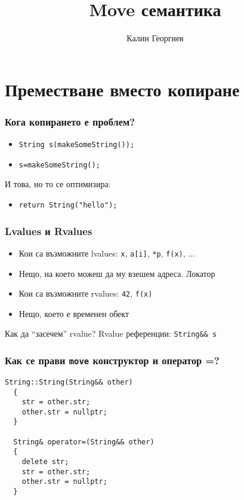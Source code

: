 \documentclass{beamer}
\begin{document}
\title[Обектно-ориентирано програмиране]{Move семантика} 
\author{Калин Георгиев} 
\frame{\titlepage} 


\section{Преместване вместо копиране} 

\begin{frame}[fragile]
  \frametitle{Кога копирането е проблем?}
  \begin{itemize}
    \item \verb#String s(makeSomeString());#
    \item \verb#s=makeSomeString();#
  \end{itemize}

  \bigskip
  И това, но то се оптимизира:
  \bigskip

  \begin{itemize}
    \item \verb#return String("hello");#
  \end{itemize}
\end{frame}


\begin{frame}[fragile]
  \frametitle{Lvalues и Rvalues}

  \begin{itemize}
    \item Кои са възможните lvalues: \texttt{x}, \texttt{a[i]}, \texttt{*p}, \texttt{f(x)}, ...
    \item Нещо, на което можеш да му взешем адреса. Локатор
    \item Кои са възможните rvalues: \texttt{42}, \texttt{f(x)}
    \item Нещо, което е временен обект
  \end{itemize}

  \bigskip

  Как да ``засечем'' rvalue? Rvalue референции: \verb#String&& s#

    
\end{frame}


\begin{frame}[fragile]
  \frametitle{Как се прави \texttt{move} конструктор и оператор =?}

\begin{lstlisting}[basicstyle=\small]
  String::String(String&& other)
  {
    str = other.str;
    other.str = nullptr;
  }

  String& operator=(String&& other)
  {
    delete str;
    str = other.str;
    other.str = nullptr;
  }
\end{lstlisting}  

\end{frame}
\end{document}
